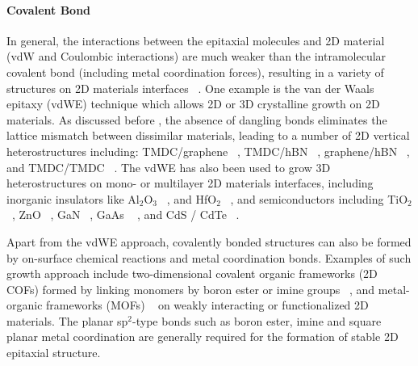 \paragraph{Covalent Bond}
In general, the interactions between the epitaxial molecules and 2D
material (vdW and Coulombic interactions) are much weaker than the
intra\-molecular covalent bond (including metal coordination forces),
resulting in a variety of structures on 2D materials interfaces
~\cite{Bakti_Utama_2013_rev_epitax}. One example is the van der Waals
epitaxy (vdWE) technique which allows 2D or 3D crystalline growth on
2D materials. As discussed before , the
absence of dangling bonds eliminates the lattice mismatch between
dissimilar materials, leading to a number of 2D vertical
heterostructures including: TMDC/graphene
~\cite{Shi_2012_vdw_epi_MoS2_gr,Liu_2016_epi_MoS2_gr_rotation,Lin_2014_vdW_solid,Lin_2015_Wse2_MoS2_gr,Azizi_2015_Freevdw_Gr_TMDCs,Kim_2016_BiSnTe_gr},
TMDC/hBN
~\cite{Yan_2015_MoS2_on_hBN,Wang_2015_cvd_MoS2_BN,Cattelan_2015_Ws2_hBN},
graphene/hBN
~\cite{Liu_2011_gr_hBN,Zhang_2015_gr_hBN,Driver_2016_MBE_gr_hBN}, and
TMDC/TMDC
~\cite{Zhang_2014_vdw_epi_SnS2_MoS2,Diaz_2015_MoTe2_MoSe2,Gong_2014_WS2_MoS2,Alemayehu_2015_TMDC_vdw}.
%
The vdWE has also been used to grow 3D heterostructures on mono- or
multilayer 2D materials interfaces, including inorganic insulators like Al\(_{\text{2}}\)O\(_{\text{3}}\)
~\cite{Zhang_2014_Al2O3_ALO_Gr,Vaziri_2013_ALD_Al2O3_gr}, and
HfO\(_{\text{2}}\) ~\cite{Alaboson_2011_PTCDA_gr_ALD},
%
and semiconductors including TiO\(_{\text{2}}\)
~\cite{Li_2015_TiO2_GO,Kumar_2011_gr_TiO2_generator,Zhang_2011_TiO2_gr},
ZnO ~\cite{Chung_2010_GaN_ZnO_gr,Oh_2014_ZnO_hBN}, GaN
~\cite{Kobayashi_2012_GaN_hBN,Kim_2014_direct_vdw_GaN_gr,Kim_2017_remote_epi_Gr},
GaAs ~\cite{Alaskar_2015_GaAs_gr_Si_theor,Kim_2017_remote_epi_Gr}
, and CdS / CdTe
~\cite{Loeher_1994_vdw_epi_CdS_MoTe,Loeher_1996_CdTe_MoWTe}.

Apart from the vdWE approach, covalently bonded structures can also be
formed by on-surface chemical reactions and metal coordination
bonds. Examples of such growth approach include two-dimensional covalent organic frameworks (2D COFs) formed by linking monomers by boron ester
or imine groups
~\cite{Colson_2014_2D_COF_gr,Colson_2011_2DMOF_gr,Sun_2017_cof_gr}, and metal-organic frameworks (MOFs) ~\cite{Urgel_2015_MOF_BN,Kumar_2014_2D_MOF_gr} on weakly interacting or
functionalized 2D materials. The planar sp$^{2}$-type bonds
such as boron ester, imine and square planar metal coordination are
generally required for the formation of stable 2D epitaxial structure.

